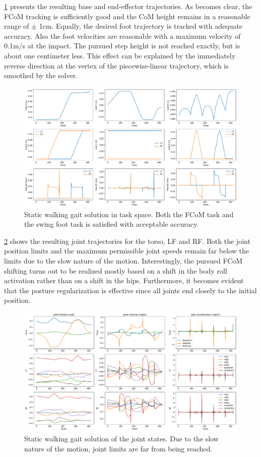 \cref{fig:walkStatic_TaskSpace} presents the resulting base and end-effector trajectories. As becomes clear, the \gls{FCoM} tracking is sufficiently good and the \gls{CoM} height remains in a reasonable range of $\pm$ 1cm. Equally, the desired foot trajectory is tracked with adequate accuracy. Also the foot velocities are reasonable with a maximum velocity of 0.1m/s at the impact. The pursued step height is not reached exactly, but is about one centimeter less. This effect can be explained by the immediately reverse direction at the vertex of the piecewise-linear trajectory, which is smoothed by the solver.
\begin{figure}[h!]
\centering	
\includegraphics[width=1\textwidth]{fig/walkStatic/TaskSpace}
\caption{Static walking gait solution in task space. Both the \gls{FCoM} task and the swing foot task is satisfied with acceptable accuracy.}
\label{fig:walkStatic_TaskSpace}
\end{figure} 

\cref{fig:walkStatic_JointState} shows the resulting joint trajectories for the torso, \gls{LF} and \gls{RF}. Both the joint position limits and the maximum permissible joint speeds remain far below the limits due to the slow nature of the motion. Interestingly, the pursued \gls{FCoM} shifting turns out to be realized mostly based on a shift in the body roll activation rather than on a shift in the hips. Furthermore, it becomes evident that the posture regularization is effective since all joints end closely to the initial position.
\begin{figure}[h!]
\centering	
\includegraphics[width=1\textwidth]{fig/walkStatic/JointState}
\caption{Static walking gait solution of the joint states. Due to the slow nature of the motion, joint limits are far from being reached.}
\label{fig:walkStatic_JointState}
\end{figure} 

